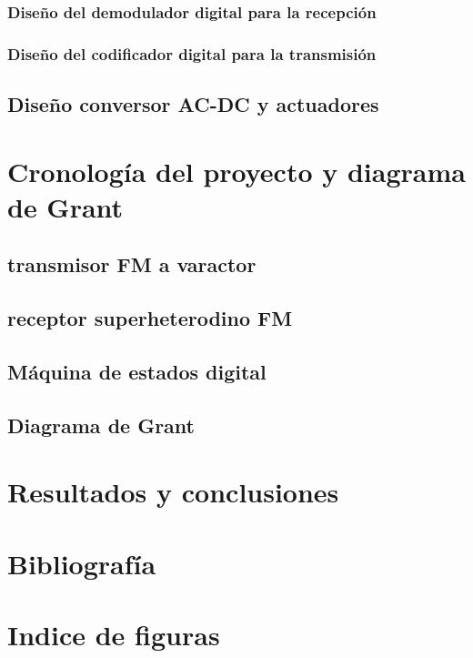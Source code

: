 \documentclass[11pt, a4paper]{article} %
\begin{document}
   \subsubsection{Diseño del demodulador digital para la recepci\'on}
   
   \subsubsection{Diseño del codificador digital para la transmisi\'on}
   
   \subsection{Diseño conversor AC-DC y actuadores}
   

\section{Cronolog\'ia del proyecto y diagrama de Grant}
   
   \subsection{transmisor FM a varactor}
   
   \subsection{receptor superheterodino FM}
   
   \subsection{M\'aquina de estados digital}
   
   \subsection{Diagrama de Grant}
   

\section{Resultados y conclusiones}
   

\section{Bibliografía}

\section{Indice de figuras}
\listoffigures
\end{document}
